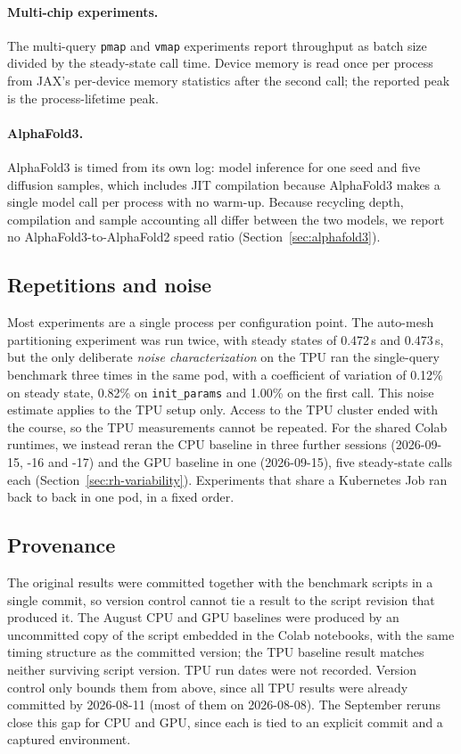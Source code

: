 \paragraph{Multi-chip experiments.} The multi-query \texttt{pmap} and
\texttt{vmap} experiments report throughput as batch size divided by the
steady-state call time. Device memory is read once per process from
JAX's per-device memory statistics after the second call; the reported
peak is the process-lifetime peak.

\paragraph{AlphaFold3.} AlphaFold3 is timed from its own log: model
inference for one seed and five diffusion samples, which includes JIT
compilation because AlphaFold3 makes a single model call per process
with no warm-up. Because recycling depth, compilation and sample
accounting all differ between the two models, we report no
AlphaFold3-to-AlphaFold2 speed ratio (Section~\ref{sec:alphafold3}).

\subsection{Repetitions and noise}
\label{sec:meth-repetitions}

Most experiments are a single process per configuration point. The
auto-mesh partitioning experiment was run twice, with steady states of
0.472\,s and 0.473\,s, but the only
deliberate \emph{noise characterization} on the TPU ran the
single-query benchmark three
times in the same pod, with a coefficient of variation of 0.12\% on
steady state, 0.82\% on \texttt{init\_params} and 1.00\% on the first
call. This noise estimate applies to the TPU setup only. Access to the
TPU cluster ended with the course, so the TPU measurements cannot be
repeated. For the shared Colab runtimes, we instead reran the CPU
baseline in three further sessions (2026-09-15, -16 and -17) and the GPU
baseline in one (2026-09-15), five steady-state calls each
(Section~\ref{sec:rh-variability}). Experiments that share a Kubernetes
Job ran back to back in one pod, in a fixed order.

\subsection{Provenance}
\label{sec:meth-provenance}

The original results were committed together with the benchmark scripts
in a single commit, so version control cannot tie a result to the
script revision that produced it. The August CPU and GPU baselines were
produced by an uncommitted copy of the script embedded in the Colab
notebooks, with the same timing structure as the committed version; the
TPU baseline result matches neither surviving script version. TPU run
dates were not recorded. Version control only bounds them from above,
since all TPU results were already committed by 2026-08-11 (most of them
on 2026-08-08). The September
reruns close this gap for CPU and GPU, since each is tied to an explicit
commit and a captured environment.

